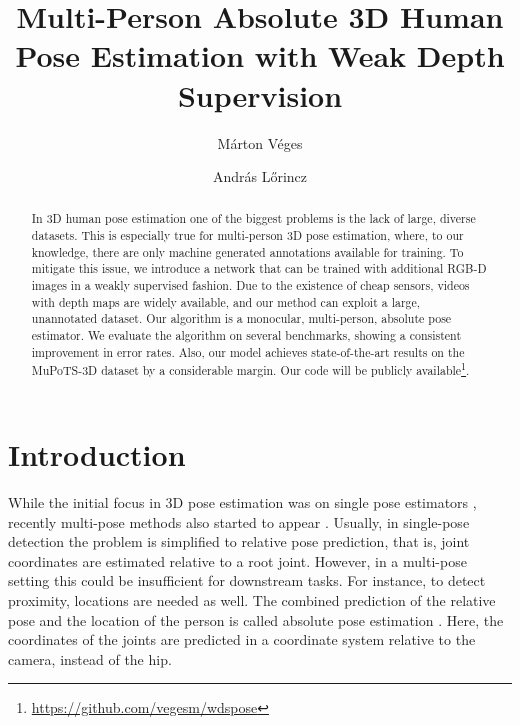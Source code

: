 \documentclass[runningheads]{llncs}
\begin{document}
\title{Multi-Person Absolute 3D Human Pose Estimation with Weak Depth Supervision}

\author{M\'{a}rton V\'{e}ges \and
Andr\'{a}s L\H{o}rincz}


\maketitle

\begin{abstract}
In 3D human pose estimation one of the biggest problems is the lack of large, diverse datasets. This is especially true for multi-person 3D pose estimation, where, to our knowledge, there are only machine generated annotations available for training. To mitigate this issue, we introduce a network that can be trained with additional RGB\nobreakdash-D images in a weakly supervised fashion. Due to the existence of cheap sensors, videos with depth maps are widely available, and our method can exploit a large, unannotated dataset. Our algorithm is a monocular, multi-person, absolute pose estimator. We evaluate the algorithm on several benchmarks, showing a consistent improvement in error rates. Also, our model achieves state-of-the-art results on the MuPoTS-3D dataset by a considerable margin. Our code will be publicly available\footnote{\url{https://github.com/vegesm/wdspose}}.
\end{abstract}

\section{Introduction}\label{sec:intro}

While the initial focus in 3D pose estimation was on single pose estimators \cite{zhou2017,fang2018posegrammar,helge_geometry-aware,Hossain2017temporal,3dbaseline,mehta}, recently multi-pose methods also started to appear \cite{veges2019depthpose,moon2019camdistance,zanfir2018multipose,dabral2019multiperson}. Usually, in single-pose detection the problem is simplified to relative pose prediction, that is, joint coordinates are estimated relative to a root joint. However, in a multi-pose setting this could be insufficient for downstream tasks. For instance, to detect proximity, locations are needed as well. The combined prediction of the relative pose and the location of the person is called absolute pose estimation \cite{veges2019depthpose}. Here, the coordinates of the joints are predicted in a coordinate system relative to the camera, instead of the hip.
\end{document}
